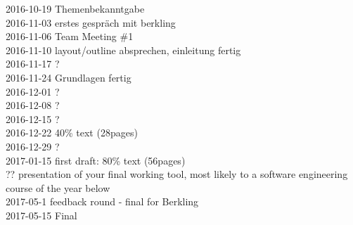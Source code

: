2016-10-19	Themenbekanntgabe\\
2016-11-03	erstes gespräch mit berkling\\
2016-11-06	Team Meeting \#1\\
2016-11-10	layout/outline absprechen, einleitung fertig\\
2016-11-17	?\\
2016-11-24	Grundlagen fertig\\
2016-12-01	?\\
2016-12-08	?\\
2016-12-15	?\\
2016-12-22	40\% text (28pages)\\
2016-12-29	?\\
2017-01-15	first draft: 80\% text  (56pages)\\
??	presentation of your final working tool, most likely to a software engineering course of the year below\\
2017-05-1	feedback round - final for Berkling\\
2017-05-15	Final\\
